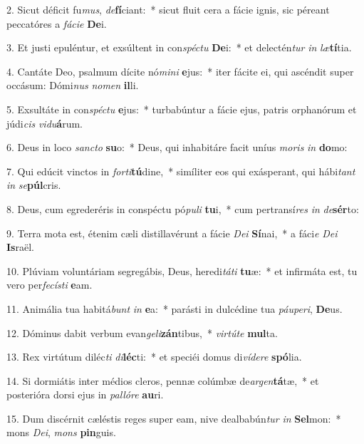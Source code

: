 2. Sicut déficit fu\textit{mus}, \textit{de}\textbf{fí}ciant:~*  sicut fluit cera a fácie ignis, sic péreant peccatóres a \textit{fá}\textit{ci}\textit{e} \textbf{De}i.\

3. Et justi epuléntur, et exsúltent in con\textit{spéc}\textit{tu} \textbf{De}i:~*  et delectén\textit{tur} \textit{in} \textit{læ}\textbf{tí}tia.\

4. Cantáte Deo, psalmum dícite nó\textit{mi}\textit{ni} \textbf{e}jus:~*  iter fácite ei, qui ascéndit super occásum: Dómi\textit{nus} \textit{no}\textit{men} \textbf{il}li.\

5. Exsultáte in con\textit{spéc}\textit{tu} \textbf{e}jus:~*  turbabúntur a fácie ejus, patris orphanórum et júdi\textit{cis} \textit{vi}\textit{du}\textbf{á}rum.\

6. Deus in loco \textit{sanc}\textit{to} \textbf{su}o:~*  Deus, qui inhabitáre facit uníus \textit{mo}\textit{ris} \textit{in} \textbf{do}mo:\

7. Qui edúcit vinctos in \textit{for}\textit{ti}\textbf{tú}dine,~*  simíliter eos qui exásperant, qui hábi\textit{tant} \textit{in} \textit{se}\textbf{púl}cris.\

8. Deus, cum egrederéris in conspéctu pó\textit{pu}\textit{li} \textbf{tu}i,~*  cum pertransí\textit{res} \textit{in} \textit{de}\textbf{sér}to:\

9. Terra mota est, étenim cæli distillavérunt a fácie \textit{De}\textit{i} \textbf{Sí}nai,~*  a fáci\textit{e} \textit{De}\textit{i} \textbf{Is}raël.\

10. Plúviam voluntáriam segregábis, Deus, heredi\textit{tá}\textit{ti} \textbf{tu}æ:~*  et infirmáta est, tu vero per\textit{fe}\textit{cís}\textit{ti} \textbf{e}am.\

11. Animália tua habitá\textit{bunt} \textit{in} \textbf{e}a:~*  parásti in dulcédine tua \textit{páu}\textit{pe}\textit{ri}, \textbf{De}us.\

12. Dóminus dabit verbum evan\textit{ge}\textit{li}\textbf{zán}tibus,~*  \textit{vir}\textit{tú}\textit{te} \textbf{mul}ta.\

13. Rex virtútum diléc\textit{ti} \textit{di}\textbf{léc}ti:~*  et speciéi domus di\textit{ví}\textit{de}\textit{re} \textbf{spó}lia.\

14. Si dormiátis inter médios cleros, pennæ colúmbæ de\textit{ar}\textit{gen}\textbf{tá}tæ,~*  et posterióra dorsi ejus in \textit{pal}\textit{ló}\textit{re} \textbf{au}ri.\

15. Dum discérnit cæléstis reges super eam, nive dealbabún\textit{tur} \textit{in} \textbf{Sel}mon:~*  mons \textit{De}\textit{i}, \textit{mons} \textbf{pin}guis.\


